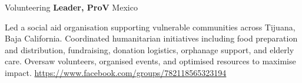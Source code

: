 \begin{rubric}{Volunteering}
\noentry{~}
\entry*[08/2018 -- 07/2020]
\textbf{Leader, ProV} \hfill Mexico\par
Led a social aid organisation supporting vulnerable communities across Tijuana, Baja California. Coordinated humanitarian initiatives including food preparation and distribution, fundraising, donation logistics, orphanage support, and elderly care. Oversaw volunteers, organised events, and optimised resources to maximise impact.\hfill {} \url{https://www.facebook.com/groups/782118565323194}
\end{rubric}


